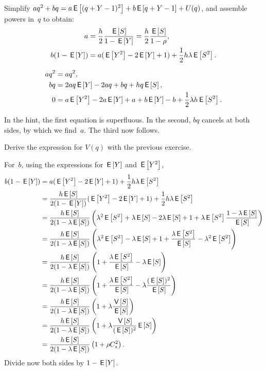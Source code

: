 \documentclass[queueing-book.tex]{subfiles}
\begin{document}
\begin{exercise}\label{ex:68}
Simplify $a q^2 +b q = a\E{(q+Y-1)^2} + b\E{q+Y-1}+ U(q)$, and assemble powers in~$q$ to obtain:
\begin{align*}
  a &= \frac h 2 \frac{\E S}{1-\E Y} = \frac{h}{2} \frac{\E S}{1- \rho}, \\
  b(1-\E Y) &= a(\E{Y^2} - 2 \E Y + 1) + \frac 12 h \lambda \E{S^2}.
\end{align*}
\begin{hint}
\begin{align*}
  a q^2 &= a q^2, \\
  b q &= 2a q \E Y - 2a q + b q + h q \E S,\\
  0 &= a \E{Y^2} - 2a \E Y + a + b \E Y - b + \frac 12 \lambda h \E{S^2}.
\end{align*}
\end{hint}
\begin{solution}
  In the hint, the first equation is superfluous.
  In the second, $bq$ cancels at both sides, by which we find~$a$.
  The third now follows.
\end{solution}
\end{exercise}

\begin{exercise}\label{ex:nm-2}
Derive
 the expression for $V(q)$ with the previous exercise.
\begin{solution}
  For~$b$, using the expressions for $\E Y$ and $\E{Y^2}$,
\begin{align*}
b(1-\E Y) &= a(\E{Y^2} - 2 \E Y + 1) + \frac 12 h \lambda \E{S^2} \\
&= \frac{h \E S}{2(1-\E Y)} (\E{Y^2} - 2 \E Y + 1) + \frac 12 h \lambda \E{S^2} \\
&= \frac{h \E S}{2(1-\lambda \E S)} \left(\lambda^2 \E{S^2} + \lambda \E S - 2 \lambda \E S + 1 +  \lambda \E{S^2}\frac{1-\lambda \E S}{\E S}\right) \\
&= \frac{h \E S}{2(1-\lambda \E S)} \left(\lambda^2 \E{S^2} - \lambda \E S + 1 +  \frac{\lambda \E{S^2}}{\E S} - \lambda^2 \E{S^2}\right) \\
&= \frac{h \E S}{2(1-\lambda \E S)} \left(1+ \frac{\lambda \E{S^2}}{\E S }  - \lambda \E S \right) \\
&= \frac{h \E S}{2(1-\lambda \E S)} \left( 1+ \frac{\lambda \E{S^2}}{\E S }  - \lambda \frac{(\E S)^2}{\E S}\right) \\
&= \frac{h \E S}{2(1-\lambda \E S)} \left( 1+ \lambda \frac{\V{S}}{\E S }\right)\\
&= \frac{h \E S}{2(1-\lambda \E S)} \left( 1+ \lambda \frac{\V{S}}{(\E S)^2 } \E S\right)\\
&= \frac{h \E S}{2(1-\lambda \E S)} \left( 1+ \rho C_s^2\right).
\end{align*}
Divide now both sides by $1-\E Y$.
\end{solution}
\end{exercise}
\end{document}
